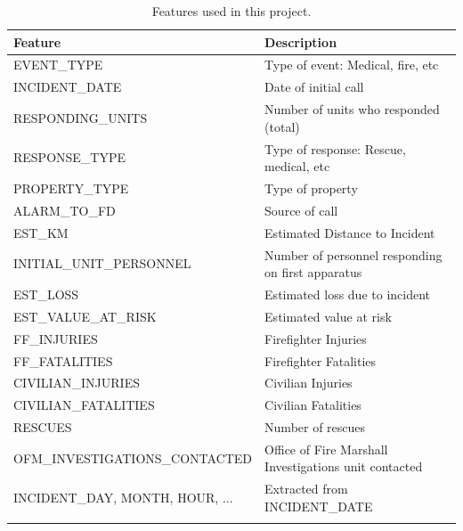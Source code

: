 \documentclass[12pt,letterpaper, oneside]
{article}
\begin{document}
\begin{table}
\vspace{-1cm}

\begin{tabular}{ p{} p{} }
\\\toprule
Feature & Description \\\midrule 
EVENT\_TYPE & Type of event: Medical, fire, etc \\ \midrule
INCIDENT\_DATE & Date of initial call \\ \midrule
RESPONDING\_UNITS & Number of units who responded (total) \\ \midrule
RESPONSE\_TYPE & Type of response: Rescue, medical, etc \\ \midrule
PROPERTY\_TYPE & Type of property \\ \midrule
ALARM\_TO\_FD & Source of call \\ \midrule
EST\_KM & Estimated Distance to Incident \\ \midrule
INITIAL\_UNIT\_\newline PERSONNEL & Number of personnel responding on first apparatus \\ \midrule
EST\_LOSS & Estimated loss due to incident \\ \midrule
EST\_VALUE\_AT\_RISK & Estimated value at risk \\ \midrule
FF\_INJURIES & Firefighter Injuries \\ \midrule
FF\_FATALITIES & Firefighter Fatalities \\ \midrule
CIVILIAN\_INJURIES & Civilian Injuries \\ \midrule
CIVILIAN\_FATALITIES & Civilian Fatalities \\ \midrule
RESCUES & Number of rescues \\ \midrule
OFM\_INVESTIGATIONS\_\newline CONTACTED & Office of Fire Marshall Investigations unit contacted \\ \midrule
INCIDENT\_DAY, MONTH, HOUR, ... & Extracted from INCIDENT\_DATE \\ \bottomrule
\vspace{-4cm}
\caption{
	Features used in this project.}\label{tab:1}

\end{tabular}
\end{table}
\end{document}
